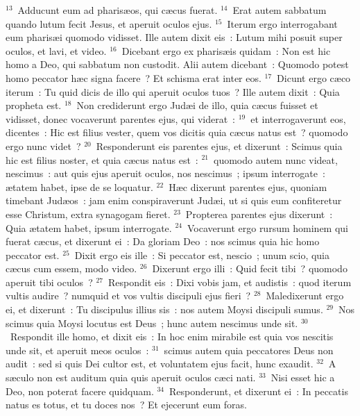 ${}^{13}$~Adducunt eum ad pharis\ae os, qui c\ae cus fuerat.
${}^{14}$~Erat autem sabbatum quando lutum fecit Jesus, et aperuit oculos ejus.
${}^{15}$~Iterum ergo interrogabant eum pharis\ae i quomodo vidisset. Ille autem dixit eis~: Lutum mihi posuit super oculos, et lavi, et video.
${}^{16}$~Dicebant ergo ex pharis\ae is quidam~: Non est hic homo a Deo, qui sabbatum non custodit. Alii autem dicebant~: Quomodo potest homo peccator h\ae c signa facere~? Et schisma erat inter eos.
${}^{17}$~Dicunt ergo c\ae co iterum~: Tu quid dicis de illo qui aperuit oculos tuos~? Ille autem dixit~: Quia propheta est.
${}^{18}$~Non crediderunt ergo Jud\ae i de illo, quia c\ae cus fuisset et vidisset, donec vocaverunt parentes ejus, qui viderat~:
${}^{19}$~et interrogaverunt eos, dicentes~: Hic est filius vester, quem vos dicitis quia c\ae cus natus est~? quomodo ergo nunc videt~?
${}^{20}$~Responderunt eis parentes ejus, et dixerunt~: Scimus quia hic est filius noster, et quia c\ae cus natus est~:
${}^{21}$~quomodo autem nunc videat, nescimus~: aut quis ejus aperuit oculos, nos nescimus~; ipsum interrogate~: \ae tatem habet, ipse de se loquatur.
${}^{22}$~H\ae c dixerunt parentes ejus, quoniam timebant Jud\ae os~: jam enim conspiraverunt Jud\ae i, ut si quis eum confiteretur esse Christum, extra synagogam fieret.
${}^{23}$~Propterea parentes ejus dixerunt~: Quia \ae tatem habet, ipsum interrogate.
${}^{24}$~Vocaverunt ergo rursum hominem qui fuerat c\ae cus, et dixerunt ei~: Da gloriam Deo~: nos scimus quia hic homo peccator est.
${}^{25}$~Dixit ergo eis ille~: Si peccator est, nescio~; unum scio, quia c\ae cus cum essem, modo video.
${}^{26}$~Dixerunt ergo illi~: Quid fecit tibi~? quomodo aperuit tibi oculos~?
${}^{27}$~Respondit eis~: Dixi vobis jam, et audistis~: quod iterum vultis audire~? numquid et vos vultis discipuli ejus fieri~?
${}^{28}$~Maledixerunt ergo ei, et dixerunt~: Tu discipulus illius sis~: nos autem Moysi discipuli sumus.
${}^{29}$~Nos scimus quia Moysi locutus est Deus~; hunc autem nescimus unde sit.
${}^{30}$~Respondit ille homo, et dixit eis~: In hoc enim mirabile est quia vos nescitis unde sit, et aperuit meos oculos~:
${}^{31}$~scimus autem quia peccatores Deus non audit~: sed si quis Dei cultor est, et voluntatem ejus facit, hunc exaudit.
${}^{32}$~A s\ae culo non est auditum quia quis aperuit oculos c\ae ci nati.
${}^{33}$~Nisi esset hic a Deo, non poterat facere quidquam.
${}^{34}$~Responderunt, et dixerunt ei~: In peccatis natus es totus, et tu doces nos~? Et ejecerunt eum foras.


